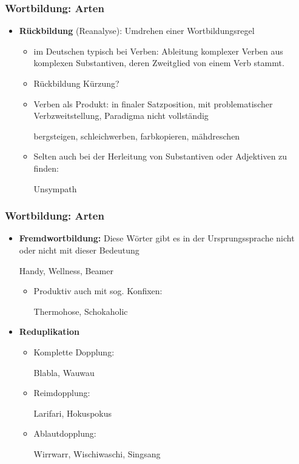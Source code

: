 \begin{frame}
\frametitle{Wortbildung: Arten}

\begin{itemize}
	\item \textbf{Rückbildung} (Reanalyse): Umdrehen einer Wortbildungsregel
	
	\begin{itemize}
		\item im Deutschen typisch bei Verben: Ableitung komplexer Verben aus komplexen Substantiven, deren Zweitglied von einem Verb stammt.
		\item Rückbildung \ras Kürzung?
		\item Verben als Produkt: in finaler Satzposition, mit problematischer Verbzweitstellung, Paradigma nicht vollständig
		
		\ea bergsteigen, schleichwerben, farbkopieren, mähdreschen
		\z
		
		\item Selten auch bei der Herleitung von Substantiven oder Adjektiven zu finden:
		
		\ea Unsympath
		\z
		
	\end{itemize}
\end{itemize}


\end{frame}


\begin{frame}
\frametitle{Wortbildung: Arten}

\begin{itemize}
	\item \textbf{Fremdwortbildung:} Diese Wörter gibt es in der Ursprungssprache nicht oder nicht mit dieser Bedeutung
	
	\ea Handy, Wellness, Beamer
	\z
	
	\begin{itemize}
		\item Produktiv auch mit sog. Konfixen:
		
		\ea Thermohose, Schokaholic
		\z
		
	\end{itemize}
	
	\item \textbf{Reduplikation}
	
	\begin{itemize}
		\item Komplette Dopplung:
		
		\ea Blabla, Wauwau
		\z
		
		\item Reimdopplung:
		
		\ea Larifari, Hokuspokus
		\z
		
		\item Ablautdopplung:
		
		\ea Wirrwarr, Wischiwaschi, Singsang
		\z
		
	\end{itemize}
\end{itemize}


\end{frame}


